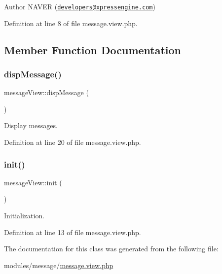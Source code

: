 \begin{DoxyAuthor}{Author}
N\+A\+V\+ER (\href{mailto:developers@xpressengine.com}{\tt developers@xpressengine.\+com}) 
\end{DoxyAuthor}


Definition at line 8 of file message.\+view.\+php.



\subsection{Member Function Documentation}
\hypertarget{classmessageView_aba0cda32f7981221f5a05f2bc8edb302}{}\label{classmessageView_aba0cda32f7981221f5a05f2bc8edb302} 
\subsubsection{\texorpdfstring{disp\+Message()}{dispMessage()}}
{\footnotesize\ttfamily message\+View\+::disp\+Message (\begin{DoxyParamCaption}{ }\end{DoxyParamCaption})}



Display messages. 



Definition at line 20 of file message.\+view.\+php.

\hypertarget{classmessageView_a247eb797a3d57ab05fc99d629014989a}{}\label{classmessageView_a247eb797a3d57ab05fc99d629014989a} 
\subsubsection{\texorpdfstring{init()}{init()}}
{\footnotesize\ttfamily message\+View\+::init (\begin{DoxyParamCaption}{ }\end{DoxyParamCaption})}



Initialization. 



Definition at line 13 of file message.\+view.\+php.



The documentation for this class was generated from the following file\+:\begin{DoxyCompactItemize}
\item 
modules/message/\hyperlink{message_8view_8php}{message.\+view.\+php}\end{DoxyCompactItemize}
